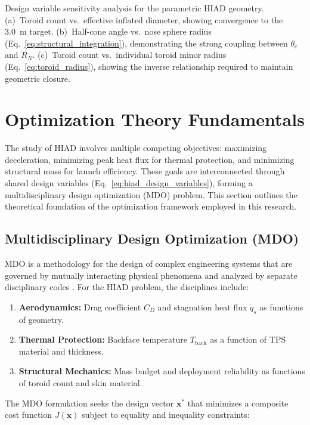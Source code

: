Design variable sensitivity analysis for the parametric HIAD geometry. (a)~Toroid count vs.\ effective inflated diameter, showing convergence to the 3.0~m target. (b)~Half-cone angle vs.\ nose sphere radius (Eq.~\ref{eq:structural_integration}), demonstrating the strong coupling between $\theta_c$ and $R_N$. (c)~Toroid count vs.\ individual toroid minor radius (Eq.~\ref{eq:toroid_radius}), showing the inverse relationship required to maintain geometric closure.


\section{Optimization Theory Fundamentals}
\label{sec:optimization_theory}

The study of HIAD involves multiple competing objectives: maximizing deceleration, minimizing peak heat flux for thermal protection, and minimizing structural mass for launch efficiency. These goals are interconnected through shared design variables (Eq.~\ref{eq:hiad_design_variables}), forming a multidisciplinary design optimization (MDO) problem. This section outlines the theoretical foundation of the optimization framework employed in this research.

\subsection{Multidisciplinary Design Optimization (MDO)}

MDO is a methodology for the design of complex engineering systems that are governed by mutually interacting physical phenomena and analyzed by separate disciplinary codes \cite{Kroo2005}. For the HIAD problem, the disciplines include:

\begin{enumerate}
    \item \textbf{Aerodynamics:} Drag coefficient $C_D$ and stagnation heat flux $\dot{q}_s$ as functions of geometry.

    \item \textbf{Thermal Protection:} Backface temperature $T_{\text{back}}$ as a function of TPS material and thickness.

    \item \textbf{Structural Mechanics:} Mass budget and deployment reliability as functions of toroid count and skin material.
\end{enumerate}

\noindent The MDO formulation seeks the design vector $\mathbf{x}^*$ that minimizes a composite cost function $J(\mathbf{x})$ subject to equality and inequality constraints:


